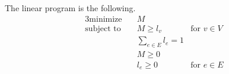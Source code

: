 \documentclass[letterpaper,11pt]{article}
\begin{document}
\begin{enumerate}
\begin{enumerate}
                The linear program is the following.
                \begin{alignat*}{3}
                    \text{minimize} \quad
                        & M \\
                    \text{subject to} \quad
                        & M \geq l_v & \text{for } v \in V \\
                        & \sum_{e \in E} l_e = 1 \\
                        & M \geq 0 \\
                        & l_e \geq 0 & \text{for } e \in E
                \end{alignat*}
        \end{enumerate}

\end{enumerate}
\end{document}
